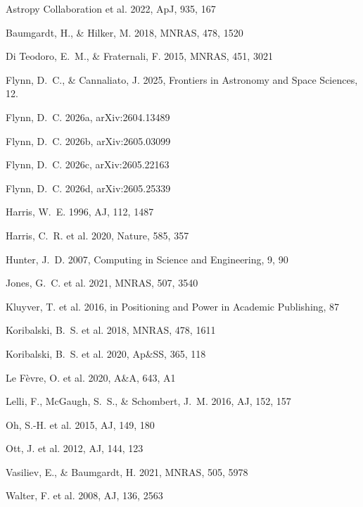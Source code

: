 \documentclass[twocolumn]{aastex631}
\begin{document}
\begin{thebibliography}{}

Astropy Collaboration et al. 2022, ApJ, 935, 167

Baumgardt, H., \& Hilker, M. 2018, MNRAS, 478, 1520

Di Teodoro, E.~M., \& Fraternali, F. 2015, MNRAS, 451, 3021

Flynn, D.~C., \& Cannaliato, J. 2025, Frontiers in Astronomy and Space
Sciences, 12. 

Flynn, D.~C. 2026a, arXiv:2604.13489

Flynn, D.~C. 2026b, arXiv:2605.03099

Flynn, D.~C. 2026c, arXiv:2605.22163

Flynn, D.~C. 2026d, arXiv:2605.25339

Harris, W.~E. 1996, AJ, 112, 1487

Harris, C.~R. et al. 2020, Nature, 585, 357

Hunter, J.~D. 2007, Computing in Science and Engineering, 9, 90

Jones, G.~C. et al. 2021, MNRAS, 507, 3540

Kluyver, T. et al. 2016, in Positioning and Power in Academic Publishing,
87

Koribalski, B.~S. et al. 2018, MNRAS, 478, 1611

Koribalski, B.~S. et al. 2020, Ap\&SS, 365, 118

Le F\`evre, O. et al. 2020, A\&A, 643, A1

Lelli, F., McGaugh, S.~S., \& Schombert, J.~M. 2016, AJ, 152, 157

Oh, S.-H. et al. 2015, AJ, 149, 180

Ott, J. et al. 2012, AJ, 144, 123

Vasiliev, E., \& Baumgardt, H. 2021, MNRAS, 505, 5978

Walter, F. et al. 2008, AJ, 136, 2563

\end{thebibliography}
\end{document}
